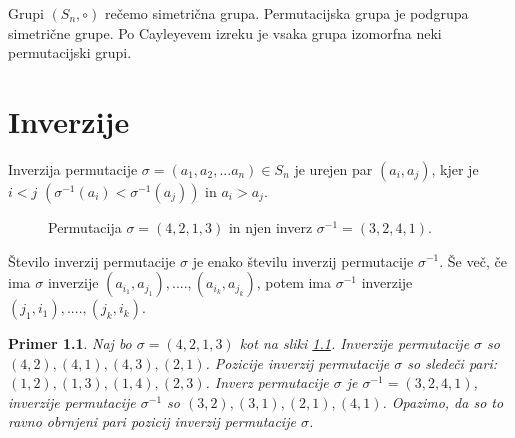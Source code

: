 \documentclass[a4paper, 12pt]{book}
\newtheorem{primer}{Primer}[chapter]
\let\ab\allowbreak
\begin{document}
Grupi $(S_n, \circ)$ rečemo simetrična grupa. Permutacijska grupa je podgrupa simetrične grupe. Po Cayleyevem izreku je vsaka grupa izomorfna neki permutacijski grupi.


\chapter{ Inverzije }

Inverzija permutacije $\sigma = (a_1, a_2,... a_n) \in S_n$ je urejen par $(a_i, a_j)$, kjer je $i < j$ $(\sigma^{-1}(a_i) < \sigma^{-1}(a_j))$ in $a_i > a_j$.

\begin{figure}[h]
    \begin{center}
    \end{center}
    \caption{Permutacija $\sigma = (4, 2, 1, 3)$ in njen inverz $\sigma^{-1} = (3, 2, 4, 1)$.}
    \label{permutacija_4213}
\end{figure}

Število inverzij permutacije $\sigma$ je enako številu inverzij permutacije $\sigma^{-1}$. Še več, če ima $\sigma$ inverzije $(a_{i_1}, a_{j_1}), ...., (a_{i_k}, a_{j_k})$, potem ima $\sigma^{-1}$ inverzije $(j_1, i_1), ...., (j_k, i_k)$.

\begin{primer}
    Naj bo $\sigma = (4, 2, 1, 3)$ kot na sliki \ref{permutacija_4213}. Inverzije permutacije $\sigma$ so $(4, 2), (4, 1), (4, 3), (2, 1)$. Pozicije inverzij permutacije $\sigma$ so sledeči pari: $(1, 2), (1, 3), (1, 4), (2, 3)$. Inverz permutacije $\sigma$ je $\sigma^{-1} = (3, 2, 4, 1)$, inverzije permutacije $\sigma^{-1}$ so $(3, 2), \ab (3, 1), (2, 1), (4, 1)$. Opazimo, da so to ravno obrnjeni pari pozicij inverzij permutacije $\sigma$.
\end{primer}
\end{document}

